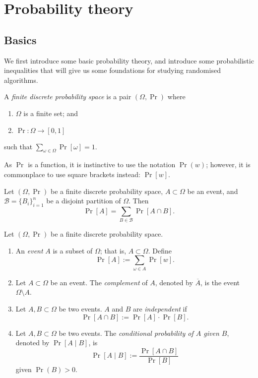 \section{Probability theory}

\subsection{Basics}

We first introduce some basic probability theory, and introduce some probabilistic inequalities that will give us some foundations for studying randomised algorithms. 

\begin{definition}
    A \emph{finite discrete probability space} is a pair $(\Omega, \Pr)$ where
    \begin{enumerate}
        \item $\Omega$ is a finite set; and 
        \item $\Pr: \Omega \to [0,1]$
    \end{enumerate} 
    such that $\sum_{\omega \in \Omega} \Pr[\omega] = 1$.
\end{definition}

\begin{remark}
    As $\Pr$ is a function, it is instinctive to use the notation $\Pr(w)$; however, it is commonplace to use square brackets instead: $\Pr[w]$.
\end{remark}

\begin{lemma}
    Let $(\Omega, \Pr)$ be a finite discrete probability space, $A \subset \Omega$ be an event, and $\mathcal B = \{B_i\}_{i=1}^n$ be a disjoint partition of $\Omega$. Then
    \[ \Pr[A] = \sum_{B \in \mathcal B} \Pr[A \cap B]. \]
\end{lemma}


\begin{definition}[Events]
    Let $(\Omega, \Pr)$ be a finite discrete probability space.
    \begin{enumerate}
        \item An \emph{event} $A$ is a subset of $\Omega$; that is, $A \subset \Omega$. Define
        \[ \Pr[A] := \sum_{\omega \in A} \Pr[w]. \]
        \item Let $A \subset \Omega$ be an event. The \emph{complement} of $A$, denoted by $\overline A$, is the event $\Omega \setminus A$. 
        \item Let $A, B \subset \Omega$ be two events. $A$ and $B$ are \emph{independent} if
        \[ \Pr[A \cap B] := \Pr[A] \cdot \Pr[B]. \]
        \item Let $A, B \subset \Omega$ be two events. The \emph{conditional probability of $A$ given $B$}, denoted by $\Pr[A \mid B]$, is
        \[ \Pr[A \mid B] := \frac{\Pr[A \cap B]}{\Pr[B]} \]
        given $\Pr(B) > 0$. 
    \end{enumerate}
\end{definition}

